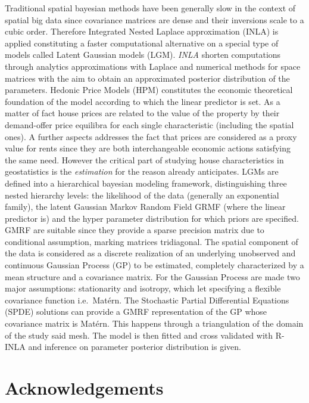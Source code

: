 \documentclass[
  12pt,
  a4paper,
  oneside]{book}
\theoremstyle{definition}
\theoremstyle{definition}
\theoremstyle{definition}
\theoremstyle{remark}
\begin{document}
Traditional spatial bayesian methods have been generally slow in the context of spatial big data since covariance matrices are dense and their inversions scale to a cubic order. Therefore Integrated Nested Laplace approximation (INLA) is applied constituting a faster computational alternative on a special type of models called Latent Gaussian models (LGM). \emph{INLA} shorten computations through analytics approximations with Laplace and numerical methods for space matrices with the aim to obtain an approximated posterior distribution of the parameters.
Hedonic Price Models (HPM) constitutes the economic theoretical foundation of the model according to which the linear predictor is set. As a matter of fact house prices are related to the value of the property by their demand-offer price equilibra for each single characteristic (including the spatial ones). A further aspects addresses the fact that prices are considered as a proxy value for rents since they are both interchangeable economic actions satisfying the same need. However the critical part of studying house characteristics in geostatistics is the \emph{estimation} for the reason already anticipates.
LGMs are defined into a hierarchical bayesian modeling framework, distinguishing three nested hierarchy levels: the likelihood of the data (generally an exponential family), the latent Gaussian Markov Random Field GRMF (where the linear predictor is) and the hyper parameter distribution for which priors are specified. GMRF are suitable since they provide a sparse precision matrix due to conditional assumption, marking matrices tridiagonal. The spatial component of the data is considered as a discrete realization of an underlying unobserved and continuous Gaussian Process (GP) to be estimated, completely characterized by a mean structure and a covariance matrix. For the Gaussian Process are made two major assumptions: stationarity and isotropy, which let specifying a flexible covariance function i.e.~Matérn.
The Stochastic Partial Differential Equations (SPDE) solutions can provide a GMRF representation of the GP whose covariance matrix is Matérn. This happens through a triangulation of the domain of the study said mesh. The model is then fitted and cross validated with R-INLA and inference on parameter posterior distribution is given.

\hypertarget{acknowledgements}{%
\section*{Acknowledgements}\label{acknowledgements}}
\end{document}
